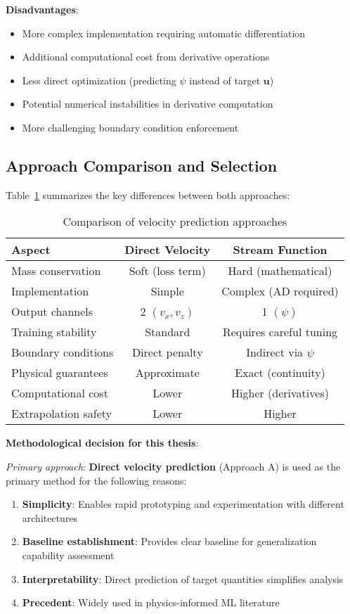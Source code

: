 \textbf{Disadvantages}:
\begin{itemize}
    \item More complex implementation requiring automatic differentiation
    \item Additional computational cost from derivative operations
    \item Less direct optimization (predicting $\psi$ instead of target $\mathbf{u}$)
    \item Potential numerical instabilities in derivative computation
    \item More challenging boundary condition enforcement
\end{itemize}

\subsection{Approach Comparison and Selection}
\label{sec:approach_comparison}

Table~\ref{tab:approach_comparison} summarizes the key differences between both approaches:

\begin{table}[htbp]
\centering
\caption{Comparison of velocity prediction approaches}
\label{tab:approach_comparison}
\begin{tabular}{@{}lcc@{}}
\toprule
\textbf{Aspect} & \textbf{Direct Velocity} & \textbf{Stream Function} \\
\midrule
Mass conservation & Soft (loss term) & Hard (mathematical) \\
Implementation & Simple & Complex (AD required) \\
Output channels & 2 $(v_x, v_z)$ & 1 $(\psi)$ \\
Training stability & Standard & Requires careful tuning \\
Boundary conditions & Direct penalty & Indirect via $\psi$ \\
Physical guarantees & Approximate & Exact (continuity) \\
Computational cost & Lower & Higher (derivatives) \\
Extrapolation safety & Lower & Higher \\
\bottomrule
\end{tabular}
\end{table}

\textbf{Methodological decision for this thesis}:

\textit{Primary approach}: \textbf{Direct velocity prediction} (Approach A) is used as the primary method for the following reasons:
\begin{enumerate}
    \item \textbf{Simplicity}: Enables rapid prototyping and experimentation with different architectures
    \item \textbf{Baseline establishment}: Provides clear baseline for generalization capability assessment
    \item \textbf{Interpretability}: Direct prediction of target quantities simplifies analysis
    \item \textbf{Precedent}: Widely used in physics-informed ML literature \cite{thuerey2020deep}
\end{enumerate}

